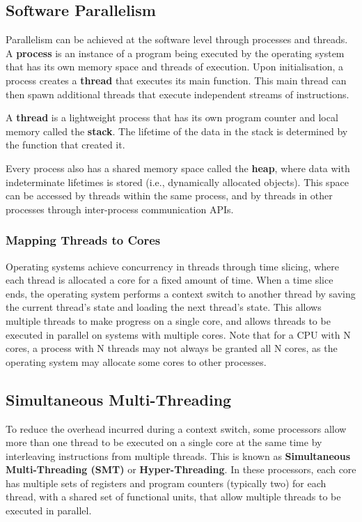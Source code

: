 \documentclass{article}
\begin{document}
\subsection{Software Parallelism}
Parallelism can be achieved at the software level through processes and
threads. A \textbf{process} is an instance of a program being executed
by the operating system that has its own memory space and threads of
execution. Upon initialisation, a process creates a \textbf{thread}
that executes its main function. This main thread can then spawn
additional threads that execute independent streams of instructions.

A \textbf{thread} is a lightweight process that has its own program
counter and local memory called the \textbf{stack}. The lifetime of the
data in the stack is determined by the function that created it.

Every process also has a shared memory space called the \textbf{heap},
where data with indeterminate lifetimes is stored (i.e., dynamically
allocated objects). This space can be accessed by threads within the
same process, and by threads in other processes through inter-process
communication APIs.
\subsubsection{Mapping Threads to Cores}
Operating systems achieve concurrency in threads through time slicing,
where each thread is allocated a core for a fixed amount of time. When
a time slice ends, the operating system performs a context switch to
another thread by saving the current thread's state and loading the
next thread's state. This allows multiple threads to make progress on a
single core, and allows threads to be executed in parallel on systems
with multiple cores. Note that for a CPU with N cores, a process with N
threads may not always be granted all N cores, as the operating system
may allocate some cores to other processes.
\subsection{Simultaneous Multi-Threading}
To reduce the overhead incurred during a context switch, some
processors allow more than one thread to be executed on a single core
at the same time by interleaving instructions from multiple threads.
This is known as \textbf{Simultaneous Multi-Threading (SMT)} or
\textbf{Hyper-Threading}. In these processors, each core has multiple
sets of registers and program counters (typically two) for each thread,
with a shared set of functional units, that allow multiple threads to
be executed in parallel.
\end{document}
